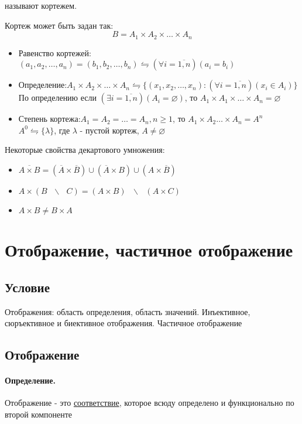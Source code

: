 \documentclass{report}
\newcommand{\bslash}{\mbox{ } \backslash \mbox{ }}
\begin{document}
называют кортежем.

Кортеж может быть задан так:
\[
B = A_1 \times A_2 \times \ldots \times  A_{n}
\] 
\begin{itemize}
	\item Равенство кортежей:\newline$(a_1,a_2,\ldots,a_n) = (b_1, b_2,\ldots,b_n) \leftrightharpoons (\forall i = \overline{1,n})(a_i = b_i)$
	\item Определение:\newline$A_1 \times A_2 \times \ldots \times A_n \leftrightharpoons \{(x_1, x_2, \ldots, x_n):(\forall i = \overline{1,n})(x_i \in A_i)\}$\newline
	      По определению если $(\exists i = \overline{1,n})(A_i = \varnothing)$, то $A_1 \times A_1 \times \ldots \times A_n = \varnothing$
	\item Степень кортежа: $A_1 = A_2 = \ldots = A_n, n \geq 1$, то $A_1 \times A_2 \ldots \times A_n = A^n$\newline
	      $A^0 \leftrightharpoons \{\lambda\}$, где $\lambda$ - пустой кортеж, $A \neq \varnothing$
\end{itemize}

Некоторые свойства декартового умножения:
\begin{itemize}
	\item $\overline{A \times B} = (\overline{A} \times \overline{B}) \cup (\overline{A} \times B) \cup (A \times \overline{B})$
	\item $A \times (B \bslash C) = (A \times B) \bslash (A \times C)$
	\item $A \times B \neq B \times A$
\end{itemize}
\newpage

\section{Отображение, частичное отображение}
\subsection{Условие}
Отображения: область определения, область значений. Инъективное, сюръективное и биективное отображения. Частичное отображение

\subsection{Отображение}
\paragraph*{Определение.}
Отображение - это \underline{соответствие},
которое всюду определено и функционально по второй компоненте
\end{document}
